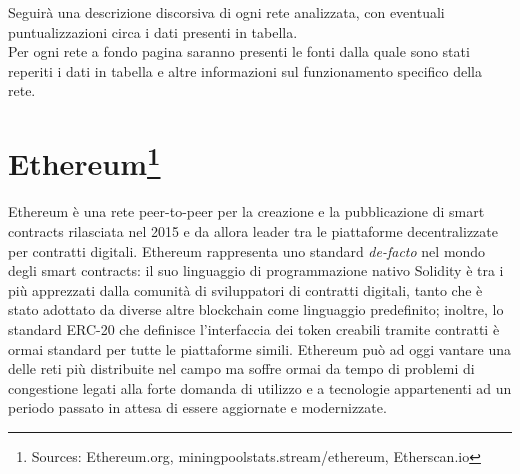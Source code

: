\documentclass[a4paper, 12pt]{article}
\begin{document}
\bigskip
\noindent
Seguirà una descrizione discorsiva di ogni rete analizzata, con eventuali puntualizzazioni circa i dati presenti in tabella.\\
Per ogni rete a fondo pagina saranno presenti le fonti dalla quale sono stati reperiti i dati in tabella e altre informazioni sul funzionamento
specifico della rete.

\newpage
\section*{Ethereum\footnote{Sources: Ethereum.org, miningpoolstats.stream/ethereum, Etherscan.io}}
Ethereum è una rete peer-to-peer per la creazione e la pubblicazione di smart contracts rilasciata nel 2015 e da allora leader tra le piattaforme decentralizzate
per contratti digitali.
Ethereum rappresenta uno standard \textit{de-facto} nel mondo degli smart contracts: il suo linguaggio di programmazione nativo Solidity è
tra i più apprezzati dalla comunità di sviluppatori di contratti digitali, tanto che è stato adottato da diverse altre blockchain come linguaggio predefinito; inoltre, lo standard ERC-20 che definisce l'interfaccia dei token creabili tramite contratti è ormai standard per tutte le piattaforme simili.
Ethereum può ad oggi vantare una delle reti più distribuite nel campo ma soffre ormai da tempo di problemi di congestione legati alla forte domanda di utilizzo e a tecnologie appartenenti ad un periodo passato in attesa di essere aggiornate e modernizzate.
\end{document}
